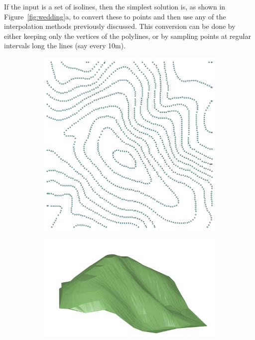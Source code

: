 If the input is a set of isolines, then the simplest solution is, as shown in Figure~\ref{fig:wedding}a, to convert these to points and then use any of the interpolation methods previously discussed.
This conversion can be done by either keeping only the vertices of the polylines, or by sampling points at regular intervals long the lines (say every 10m).
\begin{figure}
  \centering
  \begin{subfigure}[b]{0.2\linewidth}
    \centering
    \includegraphics[width=\textwidth]{figs/wedding0.png}
    \caption{}
  \end{subfigure}%
  \begin{subfigure}[b]{0.38\linewidth}
    \centering
    \includegraphics[width=\textwidth]{figs/wedding-tin.png}

\end{subfigure}
\end{figure}
